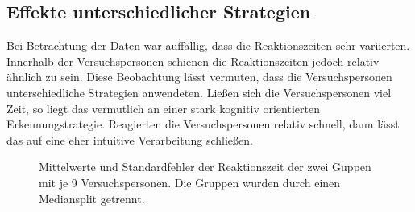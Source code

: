 \documentclass[doc,a4paper,12pt]{apa6}
\begin{document}
\subsection{Effekte unterschiedlicher Strategien}

Bei Betrachtung der Daten war auffällig, dass die Reaktionszeiten sehr variierten. Innerhalb der Versuchspersonen schienen die Reaktionszeiten jedoch relativ ähnlich zu sein. Diese Beobachtung lässt vermuten, dass die Versuchspersonen unterschiedliche Strategien anwendeten. Ließen sich die Versuchspersonen viel Zeit, so liegt das vermutlich an einer stark kognitiv orientierten Erkennungstrategie. Reagierten die Versuchspersonen relativ schnell, dann lässt das auf eine eher intuitive Verarbeitung schließen.

\begin{figure}[t]
  \centering
  \begin{minipage}{\textwidth}
    \vspace{10pt}
    \caption{Mittelwerte und Standardfehler der Reaktionszeit der zwei Guppen mit je 9 Versuchspersonen. Die Gruppen wurden durch einen Mediansplit getrennt.}
    \label{strat}
  \end{minipage}
\end{figure}
\end{document}

